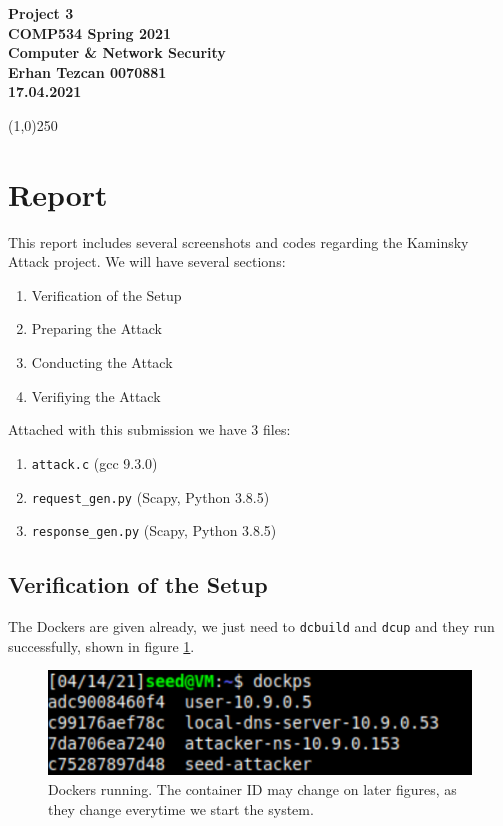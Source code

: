 \documentclass[12pt,reqno]{amsart}
\newcommand{\code}[1]{\texttt{#1}}
\begin{document}
\begin{center}
\large\textbf{Project 3 \\ COMP534 Spring 2021\\Computer \& Network Security \\}
\normalsize\textbf{ Erhan Tezcan 0070881 \\ 17.04.2021} \\
\end{center}

\begin{center}
\line(1,0){250}
\end{center}

\section*{Report}

This report includes several screenshots and codes regarding the Kaminsky Attack project. We will have several sections:
\begin{enumerate}
	\item Verification of the Setup
	\item Preparing the Attack
	\item Conducting the Attack
	\item Verifiying the Attack
\end{enumerate}

Attached with this submission we have 3 files:
\begin{enumerate}
	\item \code{attack.c} (gcc 9.3.0)
	\item \code{request\_gen.py} (Scapy, Python 3.8.5)
	\item \code{response\_gen.py} (Scapy, Python 3.8.5)
\end{enumerate}

\subsection*{Verification of the Setup}
The Dockers are given already, we just need to \code{dcbuild} and \code{dcup} and they run successfully, shown in figure \ref{fig:dockers}.  

\begin{figure}[h]
\includegraphics[width=0.4\linewidth]{screenshots/docker_ps.png}
\caption{Dockers running. The container ID may change on later figures, as they change everytime we start the system.}
\label{fig:dockers}
\end{figure}
\end{document}
